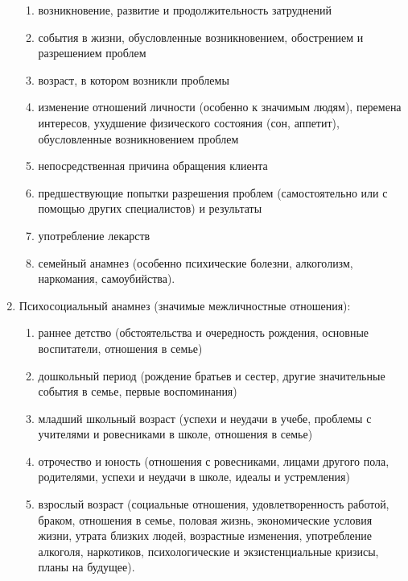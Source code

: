 \documentclass[a4paper, 12pt]{report}
\begin{document}
\begin{enumerate}
\begin{enumerate}
        \setlength\itemsep{0pt}
            \item возникновение, развитие и 
            продолжительность затруднений 
            \item события в жизни, обусловленные 
            возникновением, обострением и разрешением проблем 
            \item возраст, в котором 
            возникли проблемы 
            \item изменение отношений личности (особенно к значимым 
            людям), перемена интересов, ухудшение физического состояния (сон, аппетит), 
            обусловленные возникновением проблем 
            \item непосредственная причина обращения
            клиента 
            \item предшествующие попытки разрешения проблем (самостоятельно или 
            с помощью других специалистов) и результаты 
            \item употребление лекарств 
            \item семейный анамнез (особенно психические болезни, алкоголизм, наркомания, 
            самоубийства).
        \end{enumerate} 
        \item Психосоциальный анамнез (значимые межличностные отношения): 
        \begin{enumerate}
        \setlength\itemsep{0pt}
            \item раннее детство (обстоятельства и очередность рождения, основные 
            воспитатели, отношения в семье)
            \item дошкольный период (рождение братьев и
            сестер, другие значительные события в семье, первые воспоминания)
            \item младший школьный возраст (успехи и неудачи в учебе, проблемы с учителями 
            и ровесниками в школе, отношения в семье)
            \item отрочество и юность 
            (отношения с ровесниками, лицами другого пола, родителями, успехи и 
            неудачи в школе, идеалы и устремления)
            \item взрослый возраст (социальные 
            отношения, удовлетворенность работой, браком, отношения в семье, половая 
            жизнь, экономические условия жизни, утрата близких людей, возрастные 
            изменения, употребление алкоголя, наркотиков, психологические и 
            экзистенциальные кризисы, планы на будущее). 
        \end{enumerate}
    \end{enumerate}
\end{document}
